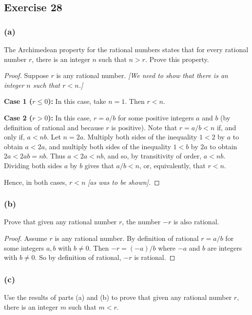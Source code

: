 \documentclass[14pt]{extarticle}
\begin{document}
\subsection{Exercise 28}

\subsubsection{(a)}
The Archimedean property for the rational numbers states that for every rational number $r$, there is an integer $n$ such that $n > r$. Prove this property.

\begin{proof}
    Suppose $r$ is any rational number. {\it [We need to show that there is an integer $n$ such that $r < n$.]}

        {\bf Case 1 ($r \leq 0$):} In this case, take $n = 1$. Then
    $r < n$.

        {\bf Case 2 ($r > 0$):} In this case, $r = a/b$ for some positive integers $a$ and $b$ (by definition of rational
    and because $r$ is positive). Note that $r = a/b < n$ if, and only if, $a < nb$. Let $n = 2a$. Multiply both sides of
    the inequality $1 < 2$ by $a$ to obtain $a < 2a$, and multiply both sides of the inequality $1 < b$ by $2a$ to
    obtain $2a < 2ab = nb$. Thus $a < 2a < nb$, and so, by transitivity of order, $a < nb$. Dividing both sides $a$ by
    $b$ gives that $a/b < n$, or, equivalently, that $r < n$.

    Hence, in both cases, $r < n$ {\it [as was to be shown].}
\end{proof}

\subsubsection{(b)}
Prove that given any rational number $r$, the number $-r$ is also rational.

\begin{proof}
    Assume $r$ is any rational number.
    By definition of rational $r = a/b$ for some integers $a,b$ with $b \neq 0$.
    Then $-r = (-a)/b$ where $-a$ and $b$ are integers with $b \neq 0$.
    So by definition of rational, $-r$ is rational.
\end{proof}

\subsubsection{(c)}
Use the results of parts (a) and (b) to prove that given any rational number $r$, there is an integer $m$ such that $m < r$.
\end{document}
